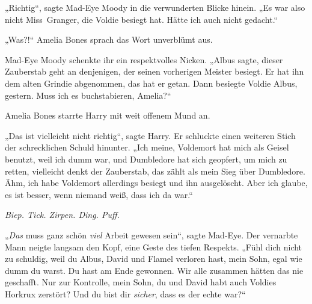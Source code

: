 „Richtig“, sagte Mad-Eye Moody in die verwunderten Blicke hinein. „Es war also nicht Miss~Granger, die Voldie besiegt hat. Hätte ich auch nicht gedacht.“

„Was?!“ Amelia Bones sprach das Wort unverblümt aus.

Mad-Eye Moody schenkte ihr ein respektvolles Nicken.
„Albus sagte, dieser Zauberstab geht an denjenigen, der seinen vorherigen Meister besiegt. Er hat ihn dem alten Grindie abgenommen, das hat er getan. Dann besiegte Voldie Albus, gestern. Muss ich es buchstabieren, Amelia?“

Amelia Bones starrte Harry mit weit offenem Mund an.

„Das ist vielleicht nicht richtig“, sagte Harry. Er schluckte einen weiteren Stich der schrecklichen Schuld hinunter. „Ich meine, Voldemort hat mich als Geisel benutzt, weil ich dumm war, und Dumbledore hat sich geopfert, um mich zu retten, vielleicht denkt der Zauberstab, das zählt als mein Sieg über Dumbledore. Ähm, ich habe Voldemort allerdings besiegt und ihn ausgelöscht. Aber ich glaube, es ist besser, wenn niemand weiß, dass ich da war.“

\emph{Biep. Tick. Zirpen. Ding. Puff.}

„\emph{Das} muss ganz schön \emph{viel} Arbeit gewesen sein“, sagte Mad-Eye. Der vernarbte Mann neigte langsam den Kopf, eine Geste des tiefen Respekts. „Fühl dich nicht zu schuldig, weil du Albus, David und Flamel verloren hast, mein Sohn, egal wie dumm du warst. Du hast am Ende gewonnen. Wir alle zusammen hätten das nie geschafft. Nur zur Kontrolle, mein Sohn, du und David habt auch Voldies Horkrux zerstört? Und du bist dir \emph{sicher}, dass es der echte war?“

